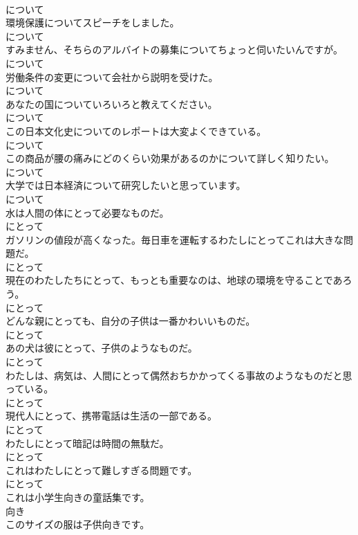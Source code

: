 \documentclass[8pt]{extreport}
\begin{document}
\begin{CJK}{UTF8}{min}
\\	について
\\	環境保護についてスピーチをしました。	
\\	について
\\	すみません、そちらのアルバイトの募集についてちょっと伺いたいんですが。	
\\	について
\\	労働条件の変更について会社から説明を受けた。	
\\	について
\\	あなたの国についていろいろと教えてください。	
\\	について
\\	この日本文化史についてのレポートは大変よくできている。	
\\	について
\\	この商品が腰の痛みにどのくらい効果があるのかについて詳しく知りたい。	
\\	について
\\	大学では日本経済について研究したいと思っています。	
\\	について
\\	水は人間の体にとって必要なものだ。	
\\	にとって
\\	ガソリンの値段が高くなった。毎日車を運転するわたしにとってこれは大きな問題だ。	
\\	にとって
\\	現在のわたしたちにとって、もっとも重要なのは、地球の環境を守ることであろう。	
\\	にとって
\\	どんな親にとっても、自分の子供は一番かわいいものだ。	
\\	にとって
\\	あの犬は彼にとって、子供のようなものだ。	
\\	にとって
\\	わたしは、病気は、人間にとって偶然おちかかってくる事故のようなものだと思っている。	
\\	にとって
\\	現代人にとって、携帯電話は生活の一部である。	
\\	にとって
\\	わたしにとって暗記は時間の無駄だ。	
\\	にとって
\\	これはわたしにとって難しすぎる問題です。	
\\	にとって
\\	これは小学生向きの童話集です。	
\\	向き
\\	このサイズの服は子供向きです。	

\end{CJK}
\end{document}
